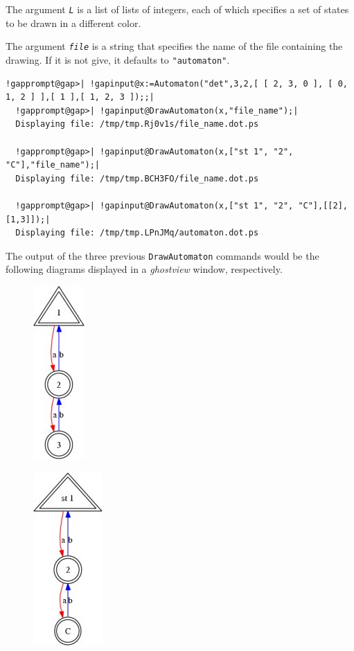 \documentclass[a4paper,11pt]{report}
\begin{document}
{{{ The argument \mbox{\texttt{\mdseries\slshape L}} is a list of lists of integers, each of which specifies a set of states to be
drawn in a different color. 

 The argument \mbox{\texttt{\mdseries\slshape file}} is a string that specifies the name of the file containing the drawing. If it
is not give, it defaults to \texttt{"automaton"}. 
\begin{Verbatim}[commandchars=!@|,fontsize=\small,frame=single,label=Example]
  !gapprompt@gap>| !gapinput@x:=Automaton("det",3,2,[ [ 2, 3, 0 ], [ 0, 1, 2 ] ],[ 1 ],[ 1, 2, 3 ]);;|
  !gapprompt@gap>| !gapinput@DrawAutomaton(x,"file_name");|
  Displaying file: /tmp/tmp.Rj0v1s/file_name.dot.ps
  
  !gapprompt@gap>| !gapinput@DrawAutomaton(x,["st 1", "2", "C"],"file_name");|
  Displaying file: /tmp/tmp.BCH3FO/file_name.dot.ps
  
  !gapprompt@gap>| !gapinput@DrawAutomaton(x,["st 1", "2", "C"],[[2],[1,3]]);|
  Displaying file: /tmp/tmp.LPnJMq/automaton.dot.ps
\end{Verbatim}
 The output of the three previous \texttt{DrawAutomaton} commands would be the following diagrams displayed in a \emph{ghostview} window, respectively. 

  \begin{figure}[htbp] \begin{center} \leavevmode \includegraphics[bb=0 0 74
250]{aut2.jpg} \end{center} \label{fig:aut2} \end{figure}   

  \begin{figure}[htbp] \begin{center} \leavevmode \includegraphics[bb=0 0 100
250]{aut2_1.jpg} \end{center} \label{fig:aut2_1} \end{figure}   

}}}
\end{document}
